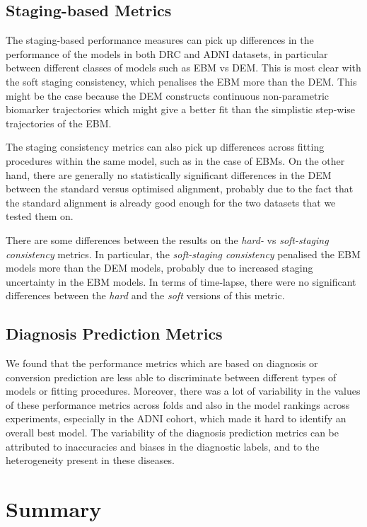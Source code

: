 \subsection{Staging-based Metrics}

The staging-based performance measures can pick up differences in the performance of the models in both DRC and ADNI datasets, in particular between different classes of models such as EBM vs DEM. This is most clear with the soft staging consistency, which penalises the EBM more than the DEM. This might be the case because the DEM constructs continuous non-parametric biomarker trajectories which might give a better fit than the simplistic step-wise trajectories of the EBM. 

The staging consistency metrics can also pick up differences across fitting procedures within the same model, such as in the case of EBMs. On the other hand, there are generally no statistically significant differences in the DEM between the standard versus optimised alignment, probably due to the fact that the standard alignment is already good enough for the two datasets that we tested them on.

There are some differences between the results on the \emph{hard-} vs \emph{soft-staging consistency} metrics. In particular, the \emph{soft-staging consistency} penalised the EBM models more than the DEM models, probably due to increased staging uncertainty in the EBM models. In terms of time-lapse, there were no significant differences between the \emph{hard} and the \emph{soft} versions of this metric.

\subsection{Diagnosis Prediction Metrics}

We found that the performance metrics which are based on diagnosis or conversion prediction are less able to discriminate between different types of models or fitting procedures. Moreover, there was a lot of variability in the values of these performance metrics across folds and also in the model rankings across experiments, especially in the ADNI cohort, which made it hard to identify an overall best model. The variability of the diagnosis prediction metrics can be attributed to inaccuracies and biases in the diagnostic labels, and to the heterogeneity present in these diseases.

\section{Summary}
\label{sec:perfSum}


